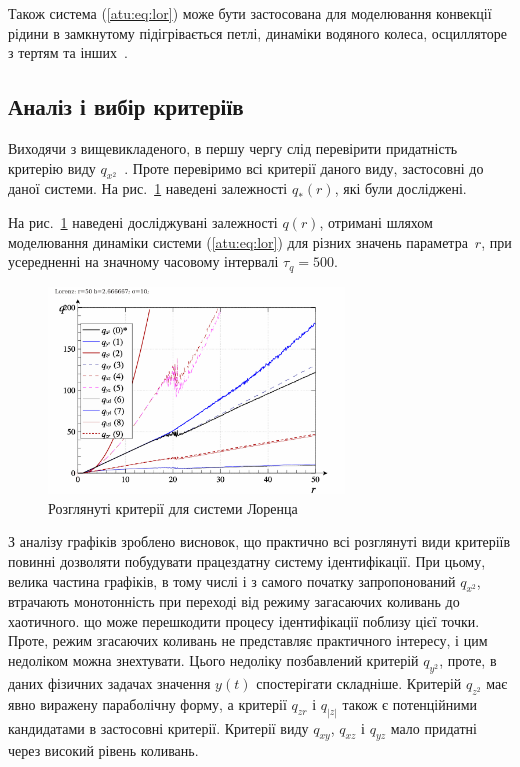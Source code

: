 Також система (\ref{atu:eq:lor}) може бути застосована для моделювання
конвекції рідини в замкнутому підігрівається петлі, динаміки
водяного колеса, осцилляторе з тертям
та інших~\cite{kuznetsov_dyn_chaos,atu_arsirii}.



\subsection{Аналіз і вибір критеріїв} %

Виходячи з вищевикладеного, в першу чергу слід перевірити придатність критерію
виду $q_{x^2}$~\cite{atu_apir2012}.
Проте перевіримо всі критерії даного виду, застосовні до
даної системи. На рис.~\ref{atu:f:lor_q} наведені залежності
$q_{*}(r)$, які були досліджені.

На рис.~\ref{atu:f:lor_q} наведені досліджувані залежності
$q(r)$, отримані шляхом моделювання динаміки системи (\ref{atu:eq:lor})
для різних значень параметра~$r$, при усередненні на значному часовому інтервалі
$ \tau_q = 500 $.


\begin{figure}[ht!]
  \centerline{\includegraphics[width=0.7\textwidth]{p/cha/lor/lor_q-p_q_r.png} }
  \caption{Розглянуті критерії для системи Лоренца}
  \label{atu:f:lor_q}
\end{figure}

З аналізу графіків зроблено висновок, що практично всі розглянуті види
критеріїв повинні дозволяти побудувати працездатну систему ідентифікації. При
цьому, велика частина графіків, в тому числі і з самого початку запропонований
$q_{x^2}$, втрачають монотонність при переході від режиму загасаючих
коливань до хаотичного.
що може перешкодити процесу ідентифікації поблизу цієї
точки. Проте, режим згасаючих коливань не представляє
практичного інтересу, і цим недоліком можна знехтувати. Цього
недоліку позбавлений критерій
$ q_{y^2} $, проте, в даних фізичних задачах значення
$ y (t) $ спостерігати складніше. Критерій
$ q_{z^2} $ має явно виражену параболічну форму, а критерії
$ q_{zr} $ і
$ q_{|z|} $ також є потенційними кандидатами в застосовні
критерії. Критерії виду
$ q_{xy} $,
$ q_{xz} $ і
$ q_{yz} $ мало придатні через високий рівень коливань.

